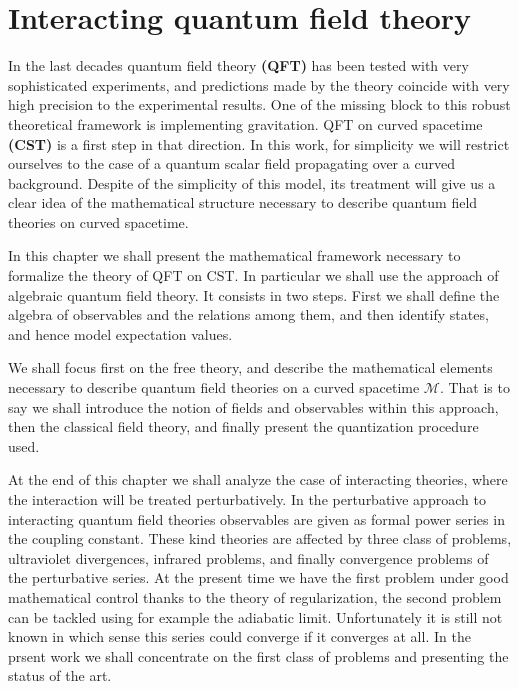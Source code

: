 \documentclass[11pt]{book}
\newcommand{\Mcal}{\mathcal{M}}
\theoremstyle{break}
\begin{document}
\chapter{Interacting quantum field theory}


In the last decades quantum field theory \textbf{(QFT)} has been tested with very sophisticated experiments, and predictions made by the theory coincide with very high precision to the experimental results. One of the missing block to this robust theoretical framework is implementing gravitation. QFT on curved spacetime \textbf{(CST)} is a first step in that direction. In this work, for simplicity we will restrict ourselves to the case of a quantum scalar field propagating over a curved background. Despite of the simplicity of this model, its treatment will give us a clear idea of the mathematical structure necessary to describe quantum field theories on curved spacetime.


In this chapter we shall present the mathematical framework necessary to formalize the theory of QFT on CST. In particular we shall use the approach of algebraic quantum field theory. It consists in two steps. First we shall define the algebra of observables and the relations among them, and then identify states, and hence model expectation values.


We shall focus first on the free theory, and describe the mathematical elements necessary to describe quantum field theories on a curved spacetime $\Mcal$. That is to say we shall introduce the notion of fields and observables within this approach, then the classical field theory, and finally present the quantization procedure used.


At the end of this chapter we shall analyze the case of interacting theories, where the interaction will be treated perturbatively. In the perturbative approach to interacting quantum field theories observables are given as formal power series in the coupling constant. These kind theories are affected by three class of problems, ultraviolet divergences, infrared problems, and finally convergence problems of the  perturbative series. At the present time we have the first problem under good mathematical control thanks to the theory of regularization, the second problem can be tackled using for example the adiabatic limit. Unfortunately it is still not known in which sense this series could converge if it converges at all. In the prsent work we shall concentrate on the first class of problems and presenting the status of the art.
\end{document}
